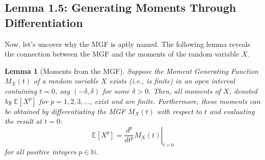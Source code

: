 \documentclass[12pt]{article}
\newtheorem{lemma}[theorem]{Lemma}
\begin{document}
\subsection{Lemma 1.5: Generating Moments Through Differentiation}

Now, let's uncover why the MGF is aptly named. The following lemma reveals the connection between the MGF and the moments of the random variable $X$.

\begin{lemma}[Moments from the MGF] \label{lemma:mgf_moments}
Suppose the Moment Generating Function $M_X(t)$ of a random variable $X$ exists (i.e., is finite) in an open interval containing $t=0$, say $(-\delta, \delta)$ for some $\delta > 0$. Then, all moments of $X$, denoted by $\mathbb{E}[X^p]$ for $p = 1, 2, 3, \dots$, exist and are finite. Furthermore, these moments can be obtained by differentiating the MGF $M_X(t)$ with respect to $t$ and evaluating the result at $t=0$:
\[
\mathbb{E}[X^p] = \left. \frac{d^p}{dt^p} M_X(t) \right|_{t=0}
\]
for all positive integers $p \in \mathbb{N}$.
\end{lemma}
\end{document}
